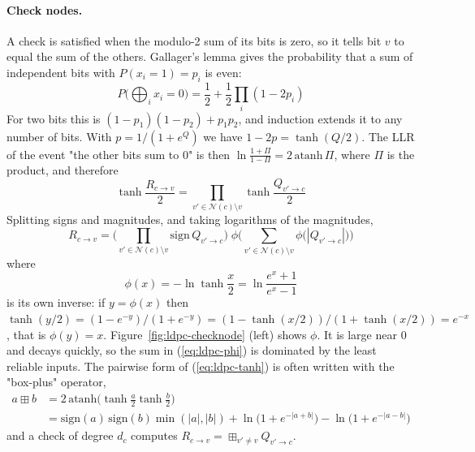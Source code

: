 \paragraph{Check nodes.} A check is satisfied when the modulo-2 sum of its bits is zero, so it tells bit \(v\) to equal the sum of the others. Gallager's lemma \cite{b:LDPCGall} gives the probability that a sum of independent bits with \(P(x_i = 1) = p_i\) is even:
\begin{equation} \label{eq:ldpc-gallager}
P\Big(\bigoplus_i x_i = 0\Big) = \frac{1}{2} + \frac{1}{2} \prod_i (1 - 2 p_i)
\end{equation}
For two bits this is \((1-p_1)(1-p_2) + p_1 p_2\), and induction extends it to any number of bits. With \(p = 1/(1 + e^{Q})\) we have \(1 - 2p = \tanh(Q/2)\). The LLR of the event "the other bits sum to 0" is then \(\ln \frac{1 + \Pi}{1 - \Pi} = 2\,\mathrm{atanh}\,\Pi\), where \(\Pi\) is the product, and therefore
\begin{equation} \label{eq:ldpc-tanh}
\tanh \frac{R_{c \to v}}{2} = \prod_{v' \in \mathcal{N}(c) \setminus v} \tanh \frac{Q_{v' \to c}}{2}
\end{equation}
Splitting signs and magnitudes, and taking logarithms of the magnitudes,
\begin{equation} \label{eq:ldpc-phi}
R_{c \to v} = \Big( \prod_{v' \in \mathcal{N}(c) \setminus v} \mathrm{sign}\, Q_{v' \to c} \Big) \; \phi\Big( \sum_{v' \in \mathcal{N}(c) \setminus v} \phi\big(|Q_{v' \to c}|\big) \Big)
\end{equation}
where
\begin{equation} \label{eq:ldpc-phidef}
\phi(x) = -\ln \tanh \frac{x}{2} = \ln \frac{e^x + 1}{e^x - 1}
\end{equation}
is its own inverse: if \(y = \phi(x)\) then \(\tanh(y/2) = (1 - e^{-y})/(1 + e^{-y}) = (1 - \tanh(x/2))/(1 + \tanh(x/2)) = e^{-x}\), that is \(\phi(y) = x\). Figure~\ref{fig:ldpc-checknode} (left) shows \(\phi\). It is large near 0 and decays quickly, so the sum in (\ref{eq:ldpc-phi}) is dominated by the least reliable inputs. The pairwise form of (\ref{eq:ldpc-tanh}) is often written with the "box-plus" operator,
\begin{equation} \label{eq:ldpc-boxplus}
\begin{aligned}
a \boxplus b &= 2\,\mathrm{atanh}\big(\tanh\tfrac{a}{2} \tanh\tfrac{b}{2}\big) \\
&= \mathrm{sign}(a)\,\mathrm{sign}(b) \min(|a|,|b|) + \ln\big(1 + e^{-|a+b|}\big) - \ln\big(1 + e^{-|a-b|}\big)
\end{aligned}
\end{equation}
and a check of degree \(d_c\) computes \(R_{c \to v} = \boxplus_{v' \ne v} Q_{v' \to c}\).


